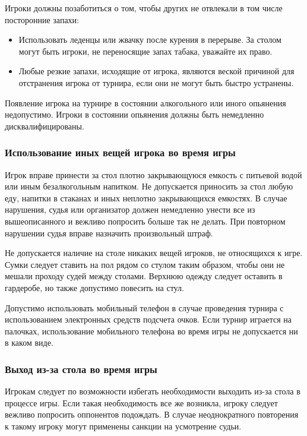 Игроки должны позаботиться о том, чтобы других не отвлекали в том числе посторонние запахи:
\begin{itemize}
	\item Использовать леденцы или жвачку после курения в перерыве. За столом могут быть игроки, не переносящие запах табака, уважайте их право.
	\item Любые резкие запахи, исходящие от игрока, являются веской причиной для отстранения игрока от турнира, если они не могут быть быстро устранены.
\end{itemize}

Появление игрока на турнире в состоянии алкогольного или иного опьянения недопустимо. Игроки в состоянии опьянения должны быть немедленно дисквалифицированы.

\subsubsection{Использование иных вещей игрока во время игры}

Игрок вправе принести за стол плотно закрывающуюся емкость с питьевой водой или иным безалкогольным напитком. Не допускается приносить за стол любую еду, напитки в стаканах и иных неплотно закрывающихся емкостях. В случае нарушения, судья или организатор должен немедленно унести все из вышеописанного и вежливо попросить больше так не делать. При повторном нарушении судья вправе назначить произвольный штраф.

Не допускается наличие на столе никаких вещей игроков, не относящихся к игре. Сумки следует ставить на пол рядом со стулом таким образом, чтобы они не мешали проходу судей между столами. Верхнюю одежду следует оставить в гардеробе, но также допустимо повесить на стул.

Допустимо использовать мобильный телефон в случае проведения турнира с использованием электронных средств подсчета очков. Если турнир играется на палочках, использование мобильного телефона во время игры не допускается ни в каком виде.

\subsubsection{Выход из-за стола во время игры}

Игрокам следует по возможности избегать необходимости выходить из-за стола в процессе игры. Если такая необходимость все же возникла, игроку следует вежливо попросить оппонентов подождать. В случае неоднократного повторения к такому игроку могут применены санкции на усмотрение судьи.

